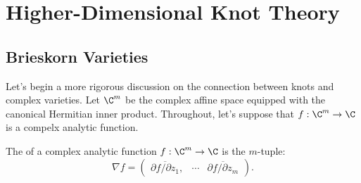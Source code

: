 \chapter{Higher-Dimensional Knot Theory} 


\section{Brieskorn Varieties}

Let's begin a more rigorous discussion on the connection between knots and complex varieties. 
Let $\C^m$ be the complex affine space equipped with the canonical Hermitian inner product. Throughout, let's suppose that $f : \C^m \to \C$ is a compelx analytic function.


\begin{definition}
  The  of a complex analytic function $f : \C^m \to \C$ is the $m$-tuple:
  \[
    \nabla f = \begin{pmatrix}\overline{\partial f / \partial z_1}, &\cdots& \overline{\partial f / \partial z_m}\end{pmatrix}.
  \]
\end{definition}
